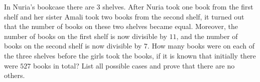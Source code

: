 In Nuria's bookcase there are 3 shelves. After Nuria took one book from the first shelf and her sister Amali took two books from the second shelf, it turned out that the number of books on these two shelves became equal. Moreover, the number of books on the first shelf is now divisible by $11$, and the number of books on the second shelf is now divisible by $7$. How many books were on each of the three shelves before the girls took the books, if it is known that initially there were $527$ books in total? List all possible cases and prove that there are no others.
